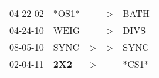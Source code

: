\begin{supertabular}{p{0.07\textwidth}p{0.06\textwidth}p{0.02\textwidth}p{0.02\textwidth}p{0.06\textwidth}}
 04-22-02\textsuperscript{} &                           *OS1* &               &  \textgreater &  BATH\textsuperscript{} \\
 04-24-10\textsuperscript{} &          WEIG\textsuperscript{} &               &  \textgreater &  DIVS\textsuperscript{} \\
 08-05-10\textsuperscript{} &          SYNC\textsuperscript{} &  \textgreater &  \textgreater &  SYNC\textsuperscript{} \\
 02-04-11\textsuperscript{} &  \textbf{2X2\textsuperscript{}} &  \textgreater &               &                   *CS1* \\
\end{supertabular}
